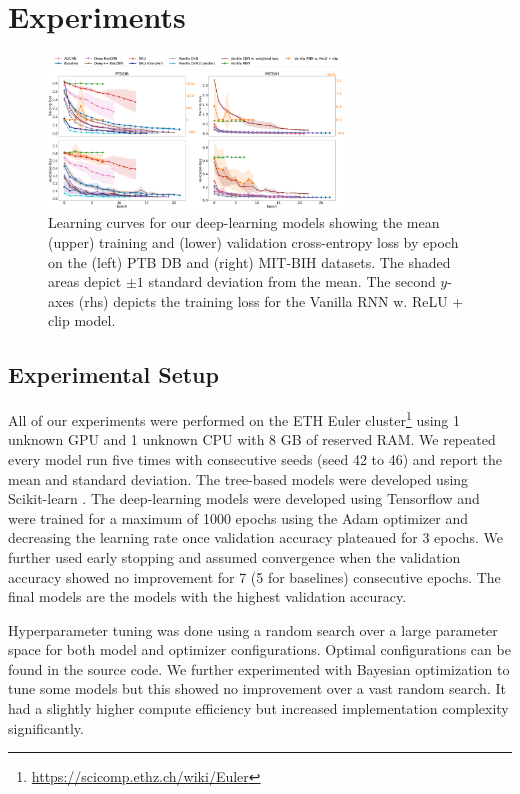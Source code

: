 \section{Experiments}
\label{sec:experiments}

\begin{figure}[t]
    \centering
    \includegraphics[width=0.70\textwidth]{figures/learning_curves.png}
    \caption{Learning curves for our deep-learning models showing the mean (upper) training and (lower) validation cross-entropy loss by epoch on the (left) PTB DB and (right) MIT-BIH datasets. The shaded areas depict \boldmath$\pm 1$ standard deviation from the mean. The second \boldmath$y$-axes (rhs) depicts the training loss for the Vanilla RNN w. ReLU + clip model.}
    \label{fig:learning_curves}
\end{figure}

\subsection{Experimental Setup}
All of our experiments were performed on the ETH Euler cluster\footnote{\url{https://scicomp.ethz.ch/wiki/Euler}} using 1 unknown GPU and 1 unknown CPU with 8 GB of reserved RAM. We repeated every model run five times with consecutive seeds (seed 42 to 46) and report the mean and standard deviation. The tree-based models were developed using Scikit-learn \citep{scikit-learn}. The deep-learning models were developed using Tensorflow \citep{tensorflow2015-whitepaper} and were trained for a maximum of 1000 epochs using the Adam optimizer \citep{kingma2014adam} and decreasing the learning rate once validation accuracy plateaued for 3 epochs. We further used early stopping and assumed convergence when the validation accuracy showed no improvement for 7 (5 for baselines) consecutive epochs. The final models are the models with the highest validation accuracy.

Hyperparameter tuning was done using a random search \citep{bergstra2012random} over a large parameter space for both model and optimizer configurations. Optimal configurations can be found in the source code. We further experimented with Bayesian optimization to tune some models but this showed no improvement over a vast random search. It had a slightly higher compute efficiency but increased implementation complexity significantly.


